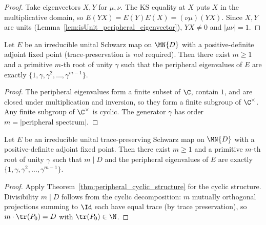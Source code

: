 \begin{proof}
    \leanok
    Take eigenvectors $X, Y$ for $\mu, \nu$. The KS equality at $X$
    puts $X$ in the multiplicative domain, so
    $E(YX) = E(Y)E(X) = (\nu\mu)(YX)$. Since $X, Y$ are units
    (Lemma~\ref{lem:isUnit_peripheral_eigenvector}), $YX \ne 0$ and
    $|\mu\nu| = 1$.
\end{proof}

\begin{theorem}%
    \label{thm:peripheral_cyclic_structure}
    \leanok
    Let $E$ be an irreducible unital Schwarz map on $\MN{D}$ with a
    positive-definite adjoint fixed point (trace-preservation is \emph{not}
    required).
    Then there exist $m \ge 1$ and a primitive $m$-th root of unity
    $\gamma$ such that the peripheral eigenvalues of $E$ are exactly
    $\{1, \gamma, \gamma^2, \ldots, \gamma^{m-1}\}$.
\end{theorem}

\begin{proof}
    \leanok
    The peripheral eigenvalues form a finite subset of $\C$,
    contain $1$, and are closed under multiplication and inversion,
    so they form a finite subgroup of $\C^\times$.
    Any finite subgroup of $\C^\times$ is cyclic.
    The generator $\gamma$ has order $m = |\text{peripheral spectrum}|$.
\end{proof}

\begin{theorem}%
    \label{thm:peripheral_cyclic_group}
    \leanok
    Let $E$ be an irreducible unital trace-preserving Schwarz map on
    $\MN{D}$ with a positive-definite adjoint fixed point.
    Then there exist $m \ge 1$ and a primitive $m$-th root of unity
    $\gamma$ such that $m \mid D$ and the peripheral eigenvalues of $E$
    are exactly $\{1, \gamma, \gamma^2, \ldots, \gamma^{m-1}\}$.
\end{theorem}

\begin{proof}
    \leanok
    Apply Theorem~\ref{thm:peripheral_cyclic_structure} for the cyclic
    structure. Divisibility $m \mid D$ follows from the cyclic
    decomposition: $m$ mutually orthogonal projections summing to $\Id$
    each have equal trace (by trace preservation), so
    $m \cdot \tr(P_0) = D$ with $\tr(P_0) \in \N$.
\end{proof}

